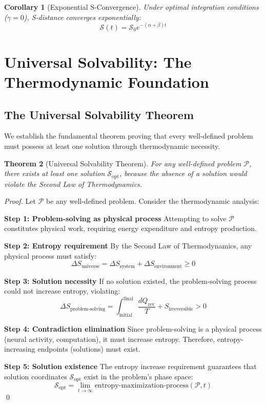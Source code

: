 \documentclass[12pt,a4paper]{article}
\newtheorem{theorem}{Theorem}[section]
\newtheorem{corollary}[theorem]{Corollary}
\begin{document}
\begin{corollary}[Exponential S-Convergence]
Under optimal integration conditions ($\gamma = 0$), S-distance converges exponentially:
\begin{equation}
\mathcal{S}(t) = \mathcal{S}_0 e^{-(\alpha + \beta)t}
\end{equation}
\end{corollary}

\section{Universal Solvability: The Thermodynamic Foundation}

\subsection{The Universal Solvability Theorem}

We establish the fundamental theorem proving that every well-defined problem must possess at least one solution through thermodynamic necessity.

\begin{theorem}[Universal Solvability Theorem]
For any well-defined problem $\mathcal{P}$, there exists at least one solution $\mathcal{S}_{\text{opt}}$, because the absence of a solution would violate the Second Law of Thermodynamics.
\end{theorem}

\begin{proof}
Let $\mathcal{P}$ be any well-defined problem. Consider the thermodynamic analysis:

\textbf{Step 1: Problem-solving as physical process}
Attempting to solve $\mathcal{P}$ constitutes physical work, requiring energy expenditure and entropy production.

\textbf{Step 2: Entropy requirement}
By the Second Law of Thermodynamics, any physical process must satisfy:
\begin{equation}
\Delta S_{\text{universe}} = \Delta S_{\text{system}} + \Delta S_{\text{environment}} \geq 0
\end{equation}

\textbf{Step 3: Solution necessity}
If no solution existed, the problem-solving process could not increase entropy, violating:
\begin{equation}
\Delta S_{\text{problem-solving}} = \int_{\text{initial}}^{\text{final}} \frac{dQ_{\text{rev}}}{T} + S_{\text{irreversible}} > 0
\end{equation}

\textbf{Step 4: Contradiction elimination}
Since problem-solving is a physical process (neural activity, computation), it must increase entropy. Therefore, entropy-increasing endpoints (solutions) must exist.

\textbf{Step 5: Solution existence}
The entropy increase requirement guarantees that solution coordinates $\mathcal{S}_{\text{opt}}$ exist in the problem's phase space:
\begin{equation}
\mathcal{S}_{\text{opt}} = \lim_{t \to \infty} \text{entropy-maximization-process}(\mathcal{P}, t)
\end{equation}
\qed
\end{proof}
\end{document}

